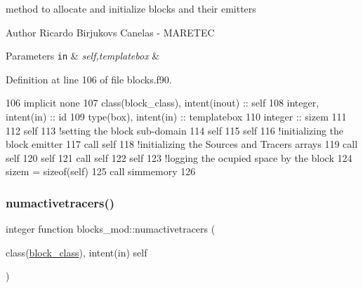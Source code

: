 method to allocate and initialize blocks and their emitters 

\begin{DoxyAuthor}{Author}
Ricardo Birjukovs Canelas -\/ M\+A\+R\+E\+T\+EC
\end{DoxyAuthor}

\begin{DoxyParams}[1]{Parameters}
\mbox{\tt in}  & {\em self,templatebox} & \\
\hline
\end{DoxyParams}


Definition at line 106 of file blocks.\+f90.


\begin{DoxyCode}
106     \textcolor{keywordtype}{implicit none}
107     \textcolor{keywordtype}{class}(block\_class), \textcolor{keywordtype}{intent(inout)} :: self
108     \textcolor{keywordtype}{integer}, \textcolor{keywordtype}{intent(in)} :: id
109     \textcolor{keywordtype}{type}(box), \textcolor{keywordtype}{intent(in)} :: templatebox
110     \textcolor{keywordtype}{integer} :: sizem
111 
112     self%
113     \textcolor{comment}{!setting the block sub-domain}
114     self%
115     self%
116     \textcolor{comment}{!initializing the block emitter}
117     \textcolor{keyword}{call }self%
118     \textcolor{comment}{!initializing the Sources and Tracers arrays}
119     \textcolor{keyword}{call }self%
120     self%
121     \textcolor{keyword}{call }self%
122     self%
123     \textcolor{comment}{!logging the ocupied space by the block}
124     sizem = sizeof(self)
125     \textcolor{keyword}{call }simmemory%
126     
\end{DoxyCode}
\mbox{\label{namespaceblocks__mod_ad8d0816321fe15e1b1e66eacdaaa10e1}} 
\subsubsection{\texorpdfstring{numactivetracers()}{numactivetracers()}}
{\footnotesize\ttfamily integer function blocks\+\_\+mod\+::numactivetracers (\begin{DoxyParamCaption}\item[{class(\mbox{\hyperlink{structblocks__mod_1_1block__class}{block\+\_\+class}}), intent(in)}]{self }\end{DoxyParamCaption})\hspace{0.3cm}{\ttfamily [private]}}



